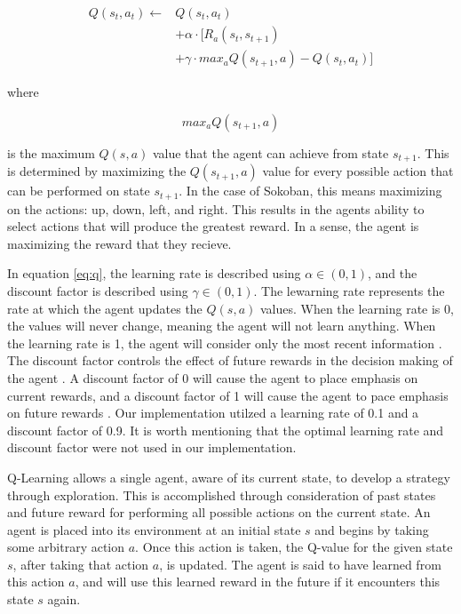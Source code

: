\documentclass[times, 10pt,twocolumn]{article}
\begin{document}
\begin{equation}
\label{eq:q}
\begin{split}
Q(s_t, a_t) \gets &Q(s_t, a_t) \\
                  &+ \alpha \cdot [R_a(s_t, s_{t+1}) \\
                  &+ \gamma \cdot max_aQ(s_{t+1}, a) - Q(s_t, a_t)]
\end{split}
\end{equation}

where 

\begin{equation}
max_aQ(s_{t+1}, a)
\end{equation}

is the maximum $Q(s, a)$ value that the agent can achieve from state $s_{t+1}$. This is determined by maximizing the $Q(s_{t+1}, a)$ value for every possible action that can be performed on state $s_{t+1}$. In the case of Sokoban, this means maximizing on the actions: up, down, left, and right. This results in the agents ability to select actions that will produce the greatest reward. In a sense, the agent is maximizing the reward that they recieve. 

In equation \ref{eq:q}, the learning rate is described using $\alpha \in (0, 1)$, and the discount factor is described using $\gamma \in (0, 1)$. The lewarning rate represents the rate at which the agent updates the $Q(s, a)$ values. When the learning rate is 0, the values will never change, meaning the agent will not learn anything. When the learning rate is 1, the agent will consider only the most recent information \cite{Littman94markovgames}. The discount factor controls the effect of future rewards in the decision making of the agent \cite{Littman94markovgames}. A discount factor of 0 will cause the agent to place emphasis on current rewards, and a discount factor of 1 will cause the agent to pace emphasis on future rewards \cite{Littman94markovgames}. Our implementation utilzed a learning rate of 0.1 and a discount factor of 0.9. It is worth mentioning that the optimal learning rate and discount factor were not used in our implementation.

Q-Learning allows a single agent, aware of its current state, to develop a strategy through exploration. This is accomplished through consideration of past states and future reward for performing all possible actions on the current state. An agent is placed into its environment at an initial state $s$ and begins by taking some arbitrary action $a$. Once this action is taken, the Q-value for the given state $s$, after taking that action $a$, is updated. The agent is said to have learned from this action $a$, and will use this learned reward in the future if it encounters this state $s$ again. 
\end{document}
